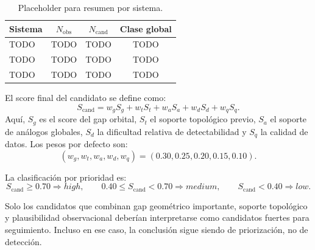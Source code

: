 \begin{table}[H]
\centering
\caption{Placeholder para resumen por sistema.}
\label{tab:system-gap-summary-placeholder}
\begin{tabular}{>{\raggedright\arraybackslash}p{} c c c}
\toprule
Sistema & $N_{\mathrm{obs}}$ & $N_{\mathrm{cand}}$ & Clase global \\
\midrule
TODO & TODO & TODO & TODO \\
TODO & TODO & TODO & TODO \\
TODO & TODO & TODO & TODO \\
\bottomrule
\end{tabular}
\end{table}

El score final del candidato se define como:
\[
S_{\mathrm{cand}} =
w_g S_g
+
w_t S_t
+
w_a S_a
+
w_d S_d
+
w_q S_q.
\]
Aqu\'i, $S_g$ es el score del gap orbital, $S_t$ el soporte topol\'ogico previo, $S_a$ el soporte de an\'alogos globales, $S_d$ la dificultad relativa de detectabilidad y $S_q$ la calidad de datos. Los pesos por defecto son:
\[
(w_g,w_t,w_a,w_d,w_q)=(0.30,0.25,0.20,0.15,0.10).
\]

La clasificaci\'on por prioridad es:
\[
S_{\mathrm{cand}}\ge 0.70 \Rightarrow high,
\qquad
0.40\le S_{\mathrm{cand}}<0.70 \Rightarrow medium,
\qquad
S_{\mathrm{cand}}<0.40 \Rightarrow low.
\]

Solo los candidatos que combinan gap geom\'etrico importante, soporte topol\'ogico y plausibilidad observacional deber\'ian interpretarse como candidatos fuertes para seguimiento. Incluso en ese caso, la conclusi\'on sigue siendo de priorizaci\'on, no de detecci\'on.
